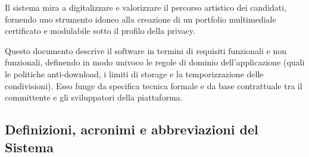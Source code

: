\documentclass[12pt,a4paper]{article}
\newcommand{\spaziocontenuto}{\mbox{}\par\vspace{1.2cm}}
\begin{document}
Il sistema mira a digitalizzare e valorizzare il percorso artistico dei candidati, fornendo uno strumento idoneo alla creazione di un portfolio multimediale certificato e modulabile sotto il profilo della privacy. 

Questo documento descrive il software in termini di requisiti funzionali e non funzionali, definendo in modo univoco le regole di dominio dell'applicazione (quali le politiche anti-download, i limiti di storage e la temporizzazione delle condivisioni). Esso funge da specifica tecnica formale e da base contrattuale tra il committente e gli sviluppatori della piattaforma.
\spaziocontenuto

\subsection{Definizioni, acronimi e abbreviazioni del Sistema}
\end{document}
